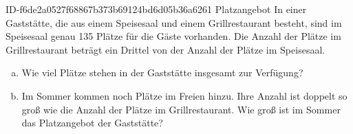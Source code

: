 \begin{exercise}
      {ID-f6de2a0527f68867b373b69124bd6d05b36a6261}
      {Platzangebot}
  \ifproblem\problem
    In einer Gaststätte, die aus einem Speisesaal und einem Grillrestaurant
    besteht, sind im Speisesaal genau 135 Plätze für die Gäste vorhanden.
    Die Anzahl der Plätze im Grillrestaurant beträgt ein Drittel von der
    Anzahl der Plätze im Speisesaal.
    \begin{enumerate}[a)]
      \item Wie viel Plätze stehen in der Gaststätte insgesamt zur Verfügung?
      \item Im Sommer kommen noch Plätze im Freien hinzu. Ihre Anzahl ist
            doppelt so groß wie die Anzahl der Plätze im Grillrestaurant.
            Wie groß ist im Sommer das Platzangebot der Gaststätte?
    \end{enumerate}
  \fi
\end{exercise}
